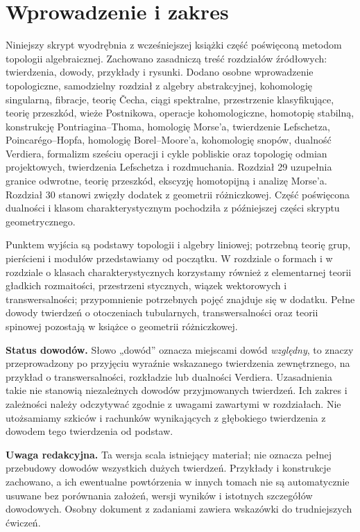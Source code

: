 \chapter*{Wprowadzenie i zakres}
{}
Niniejszy skrypt wyodrębnia z wcześniejszej książki część poświęconą
metodom topologii algebraicznej. Zachowano zasadniczą treść rozdziałów
źródłowych: twierdzenia, dowody, przykłady i rysunki.
Dodano osobne wprowadzenie topologiczne, samodzielny rozdział
z algebry abstrakcyjnej, kohomologię singularną,
fibracje, teorię \v{C}echa, ciągi spektralne, przestrzenie klasyfikujące, teorię przeszkód, wieże Postnikowa, operacje kohomologiczne, homotopię stabilną, konstrukcję Pontriagina--Thoma, homologię Morse'a, twierdzenie Lefschetza, Poincarégo--Hopfa, homologię Borel--Moore'a, kohomologię snopów, dualność Verdiera, formalizm sześciu operacji i cykle pobliskie oraz topologię odmian projektowych, twierdzenia Lefschetza i rozdmuchania. Rozdział 29 uzupełnia granice odwrotne, teorię przeszkód,
ekscyzję homotopijną i analizę Morse'a.
Rozdział 30 stanowi zwięzły dodatek z geometrii różniczkowej.
Część poświęcona dualności i klasom charakterystycznym pochodziła z
późniejszej części skryptu geometrycznego.

Punktem wyjścia są podstawy topologii i algebry liniowej;
potrzebną teorię grup, pierścieni i modułów przedstawiamy od początku.
W rozdziale o formach i w rozdziale o klasach charakterystycznych
korzystamy również z elementarnej teorii gładkich rozmaitości,
przestrzeni stycznych, wiązek wektorowych i transwersalności;
przypomnienie potrzebnych pojęć znajduje się w dodatku.
Pełne dowody twierdzeń o otoczeniach tubularnych, transwersalności
oraz teorii spinowej pozostają w książce o geometrii różniczkowej.

\noindent\textbf{Status dowodów.} Słowo „dowód” oznacza miejscami
dowód \emph{względny}, to znaczy przeprowadzony po przyjęciu
wyraźnie wskazanego twierdzenia zewnętrznego,
na przykład o transwersalności, rozkładzie lub dualności Verdiera.
Uzasadnienia takie nie stanowią niezależnych dowodów
przyjmowanych twierdzeń. Ich zakres i zależności
należy odczytywać zgodnie z uwagami zawartymi w rozdziałach.
Nie utożsamiamy szkiców i rachunków wynikających z głębokiego
twierdzenia z dowodem tego twierdzenia od podstaw.

\noindent\textbf{Uwaga redakcyjna.} Ta wersja scala istniejący materiał;
nie oznacza pełnej przebudowy dowodów wszystkich dużych twierdzeń.
Przykłady i konstrukcje zachowano, a ich ewentualne powtórzenia
w innych tomach nie są automatycznie usuwane bez porównania
założeń, wersji wyników i istotnych szczegółów dowodowych.
Osobny dokument z zadaniami zawiera wskazówki do trudniejszych ćwiczeń.
\clearpage

